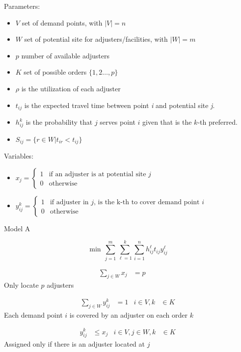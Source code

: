 \begin{frame}
  Parameters:
  \begin{itemize}
  \item $V$ set of demand points, with $|V| = n$
  \item $W$ set of potential site for adjusters/facilities, with $|W| = m$
  \item $p$ number of available adjusters
  \item $K$  set of possible orders $\{1,2\ldots,p\}$
  \item $\rho$ is the utilization of each adjuster
  \item $t_{ij}$ is the expected travel time between point \textit{i} and potential site \textit{j}.
  \item $h_{ij}^{k}$ is the probability that $j$ serves point $i$ given that is the $k$-th preferred.
  \item $S_{ij} = \{r\in W | t_{ir} < t_{ij}\}$
  \end{itemize}
  
  Variables:
  \begin{itemize}
  \item $x_j =
    \begin{cases} 
      1 & \mbox{if an adjuster is at potential site } j \\
      0 & \mbox{otherwise}
    \end{cases}$
  \item $y_{ij}^k =
    \begin{cases} 
      1 & \mbox{if adjuster in } j \mbox{, is the k-th to cover demand point }i \\
      0 & \mbox{otherwise}
  \end{cases}$
  \end{itemize}
\end{frame}

\begin{frame}[allowframebreaks]{Model A}{}

{\small
  \begin{equation}
    \min \, \sum_{j=1}^{m}{\sum_{\ell=1}^{k}{\sum_{i=1}^{n}{h_{ij}^{\ell}t_{ij}y_{ij}^{\ell}}}}
  \end{equation}
}
{\footnotesize
  \begin{align}
    \sum_{j \in W}{x_j} & = p & &
  \end{align}
  Only locate $p$ adjusters  

  \begin{align}
    \sum_{j \in W}{y_{ij}^{k}} & = 1 & i \in V, k &\in K
  \end{align}
  Each demand point $i$ is covered by an adjuster on each order $k$

  \begin{align}
    y_{ij}^{k} & \leq x_j &  i \in V,j \in W, k &\in K
  \end{align}
  Assigned only if there is an adjuster located at $j$
}
\end{frame}

